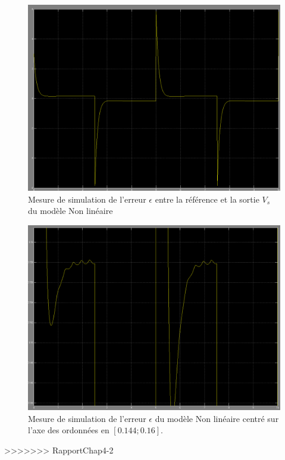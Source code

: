 \begin{figure}
\centering
\includegraphics[width = .9\textwidth]{./annexes/annexe3/NL_erreur-Consigne_Vs_RE.png}
\caption{Mesure de simulation de l'erreur $\epsilon$ entre la référence et la sortie $V_s$ du modèle Non linéaire\label{fig:SIMULINK_NL_erreur_reponse}}
\end{figure}

\begin{figure}
\centering
\includegraphics[width = .9\textwidth]{./annexes/annexe3/NL_erreur-Consigne_Vs_RE_zoom.png}
\caption{Mesure de simulation de l'erreur $\epsilon$ du modèle Non linéaire centré sur l'axe des ordonnées en $[0.144; 0.16].$\label{fig:SIMULINK_NL_erreur_reponse_zoom}}	
\end{figure}


>>>>>>> RapportChap4-2

